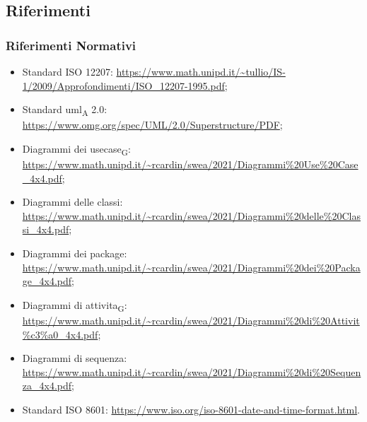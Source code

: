 \subsection{Riferimenti}
\label{ref}
    \subsubsection{Riferimenti Normativi}
        \begin{itemize}
            \item Standard ISO 12207: \url{https://www.math.unipd.it/~tullio/IS-1/2009/Approfondimenti/ISO_12207-1995.pdf};
            \item Standard uml\textsubscript{A} 2.0: \url{https://www.omg.org/spec/UML/2.0/Superstructure/PDF};
            \item Diagrammi dei usecase\textsubscript{G}: \url{https://www.math.unipd.it/~rcardin/swea/2021/Diagrammi\%20Use\%20Case_4x4.pdf};
            \item Diagrammi delle classi: \url{https://www.math.unipd.it/~rcardin/swea/2021/Diagrammi\%20delle\%20Classi_4x4.pdf};
            \item Diagrammi dei package: \url{https://www.math.unipd.it/~rcardin/swea/2021/Diagrammi\%20dei\%20Package_4x4.pdf};
            \item Diagrammi di attivita\textsubscript{G}: \url{https://www.math.unipd.it/~rcardin/swea/2021/Diagrammi\%20di\%20Attivit\%c3\%a0_4x4.pdf};
            \item Diagrammi di sequenza: \url{https://www.math.unipd.it/~rcardin/swea/2021/Diagrammi\%20di\%20Sequenza_4x4.pdf};
            \item Standard ISO 8601: \url{https://www.iso.org/iso-8601-date-and-time-format.html}.
        \end{itemize}

